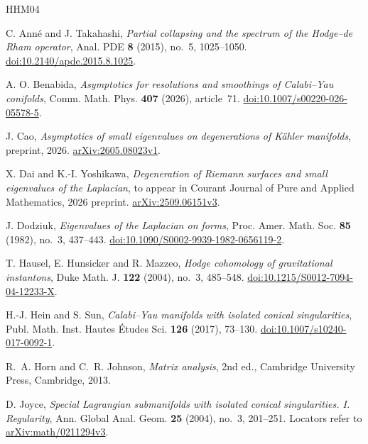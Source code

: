 \begin{thebibliography}{HHM04}

C. Ann\'e and J. Takahashi,
\emph{Partial collapsing and the spectrum of the Hodge--de Rham operator},
Anal. PDE \textbf{8} (2015), no.~5, 1025--1050.
\href{https://doi.org/10.2140/apde.2015.8.1025}{doi:10.2140/apde.2015.8.1025}.

A. O. Benabida,
\emph{Asymptotics for resolutions and smoothings of Calabi--Yau conifolds},
Comm. Math. Phys. \textbf{407} (2026), article~71.
\href{https://doi.org/10.1007/s00220-026-05578-5}{doi:10.1007/s00220-026-05578-5}.

J. Cao,
\emph{Asymptotics of small eigenvalues on degenerations of K\"ahler manifolds},
preprint, 2026.
\href{https://arxiv.org/abs/2605.08023v1}{arXiv:2605.08023v1}.

X. Dai and K.-I. Yoshikawa,
\emph{Degeneration of Riemann surfaces and small eigenvalues of the Laplacian},
to appear in Courant Journal of Pure and Applied Mathematics, 2026 preprint.
\href{https://arxiv.org/abs/2509.06151v3}{arXiv:2509.06151v3}.

J. Dodziuk,
\emph{Eigenvalues of the Laplacian on forms},
Proc. Amer. Math. Soc. \textbf{85} (1982), no.~3, 437--443.
\href{https://doi.org/10.1090/S0002-9939-1982-0656119-2}{doi:10.1090/S0002-9939-1982-0656119-2}.

T. Hausel, E. Hunsicker and R. Mazzeo,
\emph{Hodge cohomology of gravitational instantons},
Duke Math. J. \textbf{122} (2004), no.~3, 485--548.
\href{https://doi.org/10.1215/S0012-7094-04-12233-X}{doi:10.1215/S0012-7094-04-12233-X}.

H.-J. Hein and S. Sun,
\emph{Calabi--Yau manifolds with isolated conical singularities},
Publ. Math. Inst. Hautes \'Etudes Sci. \textbf{126} (2017), 73--130.
\href{https://doi.org/10.1007/s10240-017-0092-1}{doi:10.1007/s10240-017-0092-1}.

R.~A. Horn and C.~R. Johnson,
\emph{Matrix analysis}, 2nd ed.,
Cambridge University Press, Cambridge, 2013.

D. Joyce,
\emph{Special Lagrangian submanifolds with isolated conical singularities.
I. Regularity},
Ann. Global Anal. Geom. \textbf{25} (2004), no.~3, 201--251.
Locators refer to
\href{https://arxiv.org/abs/math/0211294v3}{arXiv:math/0211294v3}.


\end{thebibliography}
